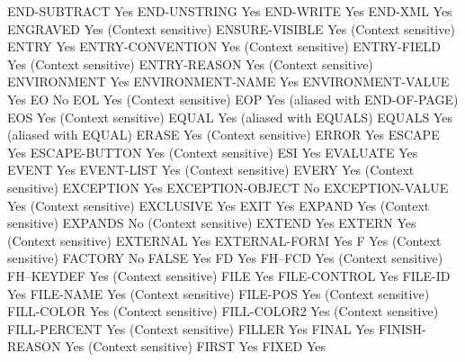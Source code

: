 END-SUBTRACT                    Yes
END-UNSTRING                    Yes
END-WRITE                       Yes
END-XML                         Yes
ENGRAVED                        Yes (Context sensitive)
ENSURE-VISIBLE                  Yes (Context sensitive)
ENTRY                           Yes
ENTRY-CONVENTION                Yes (Context sensitive)
ENTRY-FIELD                     Yes (Context sensitive)
ENTRY-REASON                    Yes (Context sensitive)
ENVIRONMENT                     Yes
ENVIRONMENT-NAME                Yes
ENVIRONMENT-VALUE               Yes
EO                              No
EOL                             Yes (Context sensitive)
EOP                             Yes (aliased with END-OF-PAGE)
EOS                             Yes (Context sensitive)
EQUAL                           Yes (aliased with EQUALS)
EQUALS                          Yes (aliased with EQUAL)
ERASE                           Yes (Context sensitive)
ERROR                           Yes
ESCAPE                          Yes
ESCAPE-BUTTON                   Yes (Context sensitive)
ESI                             Yes
EVALUATE                        Yes
EVENT                           Yes
EVENT-LIST                      Yes (Context sensitive)
EVERY                           Yes (Context sensitive)
EXCEPTION                       Yes
EXCEPTION-OBJECT                No
EXCEPTION-VALUE                 Yes (Context sensitive)
EXCLUSIVE                       Yes
EXIT                            Yes
EXPAND                          Yes (Context sensitive)
EXPANDS                         No (Context sensitive)
EXTEND                          Yes
EXTERN                          Yes (Context sensitive)
EXTERNAL                        Yes
EXTERNAL-FORM                   Yes
F                               Yes (Context sensitive)
FACTORY                         No
FALSE                           Yes
FD                              Yes
FH--FCD                         Yes (Context sensitive)
FH--KEYDEF                      Yes (Context sensitive)
FILE                            Yes
FILE-CONTROL                    Yes
FILE-ID                         Yes
FILE-NAME                       Yes (Context sensitive)
FILE-POS                        Yes (Context sensitive)
FILL-COLOR                      Yes (Context sensitive)
FILL-COLOR2                     Yes (Context sensitive)
FILL-PERCENT                    Yes (Context sensitive)
FILLER                          Yes
FINAL                           Yes
FINISH-REASON                   Yes (Context sensitive)
FIRST                           Yes
FIXED                           Yes
